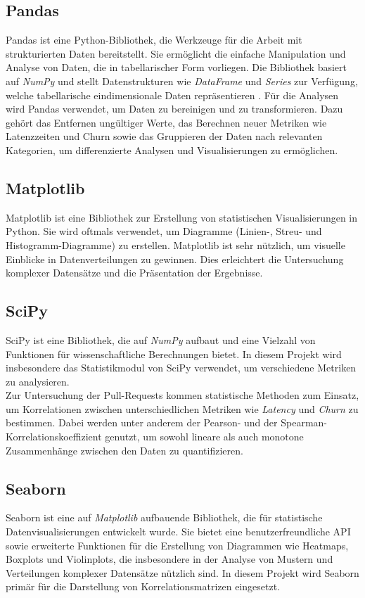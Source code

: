 \subsection{Pandas}
Pandas ist eine Python-Bibliothek, die Werkzeuge für die Arbeit mit strukturierten Daten bereitstellt. Sie ermöglicht die einfache Manipulation und Analyse von Daten, die in tabellarischer Form vorliegen. Die Bibliothek basiert auf \textit{NumPy} und stellt Datenstrukturen wie \textit{DataFrame} und \textit{Series} zur Verfügung, welche tabellarische eindimensionale Daten repräsentieren  \parencite{noauthor_pandas_nodate}. Für die Analysen wird Pandas verwendet, um Daten zu bereinigen und zu transformieren. Dazu gehört das Entfernen ungültiger Werte, das Berechnen neuer Metriken wie Latenzzeiten und Churn sowie das Gruppieren der Daten nach relevanten Kategorien, um differenzierte Analysen und Visualisierungen zu ermöglichen.

\subsection{Matplotlib}
Matplotlib ist eine Bibliothek zur Erstellung von statistischen Visualisierungen in Python. Sie wird oftmals verwendet, um Diagramme (Linien-, Streu- und Histogramm-Diagramme) zu erstellen. Matplotlib ist sehr nützlich, um visuelle Einblicke in Datenverteilungen zu gewinnen. Dies erleichtert die Untersuchung komplexer Datensätze und die Präsentation der Ergebnisse. \parencite{noauthor_matplotlib_nodate}

\subsection{SciPy}
SciPy ist eine Bibliothek, die auf \textit{NumPy} aufbaut und eine Vielzahl von Funktionen für wissenschaftliche Berechnungen bietet. In diesem Projekt wird insbesondere das Statistikmodul von SciPy verwendet, um verschiedene Metriken zu analysieren. \\
Zur Untersuchung der Pull-Requests kommen statistische Methoden zum Einsatz, um Korrelationen zwischen unterschiedlichen Metriken wie \textit{Latency} und \textit{Churn} zu bestimmen. Dabei werden unter anderem der Pearson- und der Spearman-Korre\-lations\-koeffizient genutzt, um sowohl lineare als auch monotone Zusammenhänge zwischen den Daten zu quantifizieren. \parencite{noauthor_scipy_nodate}

\subsection{Seaborn}
Seaborn ist eine auf \textit{Matplotlib} aufbauende Bibliothek, die für statistische Datenvisualisierungen entwickelt wurde. Sie bietet eine benutzerfreundliche API sowie erweiterte Funktionen für die Erstellung von Diagrammen wie Heatmaps, Boxplots und Violinplots, die insbesondere in der Analyse von Mustern und Verteilungen komplexer Datensätze nützlich sind.
In diesem Projekt wird Seaborn primär für die Darstellung von Korrelationsmatrizen eingesetzt. \parencite{waskom_seaborn_2021}


